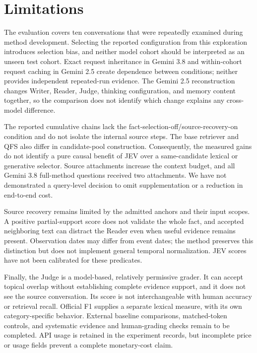\documentclass[11pt]{article}
\newcommand{\qfs}{\textsc{QFS}}
\begin{document}
\section*{Limitations}
The evaluation covers ten conversations that were repeatedly examined during method development. Selecting the reported configuration from this exploration introduces selection bias, and neither model cohort should be interpreted as an unseen test cohort. Exact request inheritance in Gemini 3.8 and within-cohort request caching in Gemini 2.5 create dependence between conditions; neither provides independent repeated-run evidence. The Gemini 2.5 reconstruction changes Writer, Reader, Judge, thinking configuration, and memory content together, so the comparison does not identify which change explains any cross-model difference.

The reported cumulative chains lack the fact-selection-off/source-recovery-on condition and do not isolate the internal source steps. The base retriever and \qfs{} also differ in candidate-pool construction. Consequently, the measured gains do not identify a pure causal benefit of JEV over a same-candidate lexical or generative selector. Source attachments increase the context budget, and all Gemini 3.8 full-method questions received two attachments. We have not demonstrated a query-level decision to omit supplementation or a reduction in end-to-end cost.

Source recovery remains limited by the admitted anchors and their input scopes. A positive partial-support score does not validate the whole fact, and accepted neighboring text can distract the Reader even when useful evidence remains present. Observation dates may differ from event dates; the method preserves this distinction but does not implement general temporal normalization. JEV scores have not been calibrated for these predicates.

Finally, the Judge is a model-based, relatively permissive grader. It can accept topical overlap without establishing complete evidence support, and it does not see the source conversation. Its score is not interchangeable with human accuracy or retrieval recall. Official F1 supplies a separate lexical measure, with its own category-specific behavior. External baseline comparisons, matched-token controls, and systematic evidence and human-grading checks remain to be completed. API usage is retained in the experiment records, but incomplete price or usage fields prevent a complete monetary-cost claim.
\end{document}
